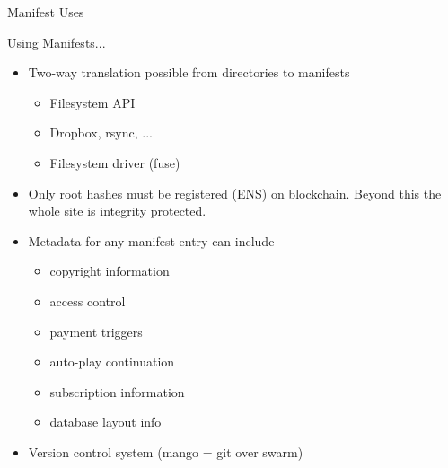 \begin{subsection}{Manifest Uses}

\begin{frame}

\begin{block}{Using Manifests...}
\begin{itemize}
 \item Two-way translation possible from directories to manifests
  \begin{itemize}
   \item Filesystem API
   \item Dropbox, rsync, ...
   \item Filesystem driver (fuse)
  \end{itemize}
 \item Only root hashes must be registered (ENS) on blockchain. Beyond this the whole site is integrity protected.
 \item Metadata for any manifest entry can include
    \begin{itemize}
      \item copyright information
      \item access control
      \item payment triggers
      \item auto-play continuation
      \item subscription information
      \item database layout info
    \end{itemize}
 \item Version control system (mango = git over swarm)
\end{itemize}
\end{block}

\end{frame}
\end{subsection}


